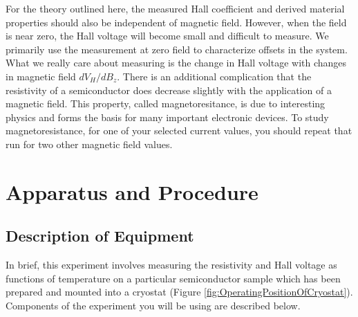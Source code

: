 \documentclass{../lab}
\begin{document}
For the theory outlined here, the measured Hall coefficient and derived material properties should also be independent of magnetic field. However, when the field is near zero, the Hall voltage will become small and difficult to measure. We primarily use the measurement at zero field to characterize offsets in the system. What we really care about measuring is the change in Hall voltage with changes in magnetic field $dV_H/dB_z$. There is an additional complication that the resistivity of a semiconductor does decrease slightly with the application of a magnetic field. This property, called magnetoresitance, is due to interesting physics and forms the basis for many important electronic devices. To study magnetoresistance, for one of your selected current values, you should repeat that run for two other magnetic field values. 

\section{Apparatus and Procedure}

\subsection{Description of Equipment}

In brief, this experiment involves measuring the resistivity and Hall voltage as functions of temperature on a particular semiconductor sample which has been prepared and mounted into a cryostat (Figure \ref{fig:OperatingPositionOfCryostat}). Components of the experiment you will be using are described below.
\end{document}
